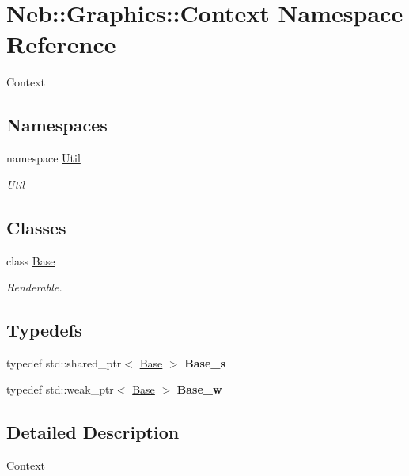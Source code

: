 \hypertarget{namespaceNeb_1_1Graphics_1_1Context}{\section{\-Neb\-:\-:\-Graphics\-:\-:\-Context \-Namespace \-Reference}
\label{namespaceNeb_1_1Graphics_1_1Context}
}


\-Context  


\subsection*{\-Namespaces}
\begin{DoxyCompactItemize}
\item 
namespace \hyperlink{namespaceNeb_1_1Graphics_1_1Context_1_1Util}{\-Util}
\begin{DoxyCompactList}\small\item\em \-Util \end{DoxyCompactList}\end{DoxyCompactItemize}
\subsection*{\-Classes}
\begin{DoxyCompactItemize}
\item 
class \hyperlink{classNeb_1_1Graphics_1_1Context_1_1Base}{\-Base}
\begin{DoxyCompactList}\small\item\em \-Renderable. \end{DoxyCompactList}\end{DoxyCompactItemize}
\subsection*{\-Typedefs}
\begin{DoxyCompactItemize}
\item 
\hypertarget{namespaceNeb_1_1Graphics_1_1Context_a33efd07ab180cb088c84c34175e40259}{typedef std\-::shared\-\_\-ptr$<$ \hyperlink{classNeb_1_1Graphics_1_1Context_1_1Base}{\-Base} $>$ {\bfseries \-Base\-\_\-s}}\label{namespaceNeb_1_1Graphics_1_1Context_a33efd07ab180cb088c84c34175e40259}

\item 
\hypertarget{namespaceNeb_1_1Graphics_1_1Context_af64895a522d4890d8d17a12f91c7742e}{typedef std\-::weak\-\_\-ptr$<$ \hyperlink{classNeb_1_1Graphics_1_1Context_1_1Base}{\-Base} $>$ {\bfseries \-Base\-\_\-w}}\label{namespaceNeb_1_1Graphics_1_1Context_af64895a522d4890d8d17a12f91c7742e}

\end{DoxyCompactItemize}


\subsection{\-Detailed \-Description}
\-Context 